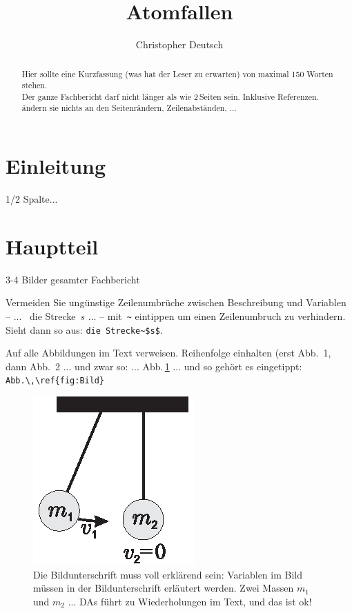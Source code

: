 \documentclass[twocolumn]{revtex4}
\begin{document}
\title{Atomfallen}

\author{Christopher Deutsch}




\begin{abstract}
%
Hier sollte eine Kurzfassung (was hat der Leser zu erwarten) von maximal 150 Worten stehen.
\\
Der ganze Fachbericht darf nicht länger als wie 2\,Seiten sein. Inklusive Referenzen. ändern sie nichts an den Seitenrändern, Zeilenabständen, ...
%
\end{abstract}

\maketitle

\section{Einleitung}
1/2 Spalte...

\section{Hauptteil}
3-4 Bilder gesamter Fachbericht


Vermeiden Sie ungünstige Zeilenumbrüche zwischen Beschreibung und Variablen -- ...~ die Strecke~$s$ ... --  mit~\verb"~" eintippen um einen Zeilenumbruch zu verhindern. Sieht dann so aus: \verb"die Strecke~$s$".

Auf alle Abbildungen im Text verweisen. Reihenfolge einhalten (erst Abb.~1, dann Abb.~2 ... und zwar  so: ... Abb.\,\ref{fig:Bild} ... und so gehört es eingetippt: \verb"Abb.\,\ref{fig:Bild}"


\begin{figure}[bbb]
\includegraphics{Bild}
%
\caption{\label{fig:Bild}
%
Die Bildunterschrift muss voll erklärend sein: Variablen im Bild müssen in der Bildunterschrift erläutert werden. Zwei Massen $m_1$ und $m_2$ ... DAs führt zu Wiederholungen im Text, und das ist ok!
%
}
%
\end{figure}
\end{document}
